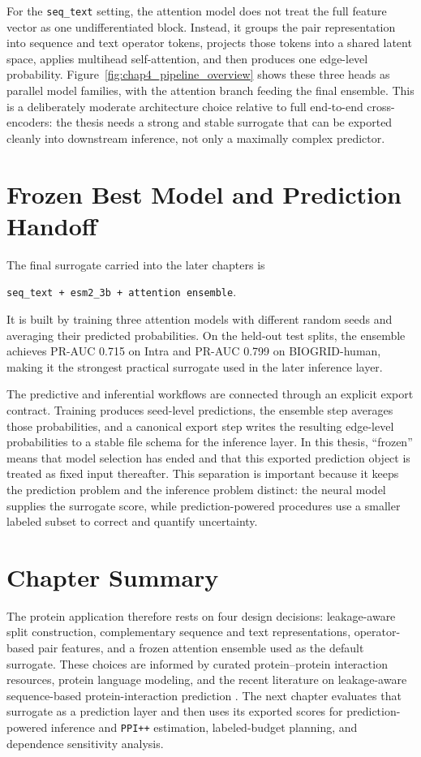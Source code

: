 For the \texttt{seq\_text} setting, the attention model does not treat the full feature vector as one undifferentiated block. Instead, it groups the pair representation into sequence and text operator tokens, projects those tokens into a shared latent space, applies multihead self-attention, and then produces one edge-level probability. Figure~\ref{fig:chap4_pipeline_overview} shows these three heads as parallel model families, with the attention branch feeding the final ensemble. This is a deliberately moderate architecture choice relative to full end-to-end cross-encoders: the thesis needs a strong and stable surrogate that can be exported cleanly into downstream inference, not only a maximally complex predictor.

\section[Frozen Model and Handoff]{Frozen Best Model and Prediction Handoff}

The final surrogate carried into the later chapters is
\begin{center}
\texttt{seq\_text + esm2\_3b + attention ensemble}.
\end{center}
It is built by training three attention models with different random seeds and averaging their predicted probabilities. On the held-out test splits, the ensemble achieves PR-AUC 0.715 on Intra and PR-AUC 0.799 on BIOGRID-human, making it the strongest practical surrogate used in the later inference layer.

The predictive and inferential workflows are connected through an explicit export contract. Training produces seed-level predictions, the ensemble step averages those probabilities, and a canonical export step writes the resulting edge-level probabilities to a stable file schema for the inference layer. In this thesis, ``frozen'' means that model selection has ended and that this exported prediction object is treated as fixed input thereafter. This separation is important because it keeps the prediction problem and the inference problem distinct: the neural model supplies the surrogate score, while prediction-powered procedures use a smaller labeled subset to correct and quantify uncertainty.

\section{Chapter Summary}

The protein application therefore rests on four design decisions: leakage-aware split construction, complementary sequence and text representations, operator-based pair features, and a frozen attention ensemble used as the default surrogate. These choices are informed by curated protein--protein interaction resources, protein language modeling, and the recent literature on leakage-aware sequence-based protein-interaction prediction \parencite{park2012, biogrid2019, luck2020, dscript2021, prottrans2022, bernett2024}. The next chapter evaluates that surrogate as a prediction layer and then uses its exported scores for prediction-powered inference and \texttt{PPI++} estimation, labeled-budget planning, and dependence sensitivity analysis.
